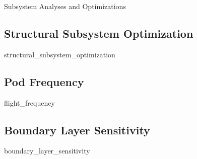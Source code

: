 Subsystem Analyses and Optimizations
\subsection{Structural Subsystem Optimization}
	{structural_subsystem_optimization}
\subsection{Pod Frequency}
	{flight_frequency}
\subsection{Boundary Layer Sensitivity}
	{boundary_layer_sensitivity}
